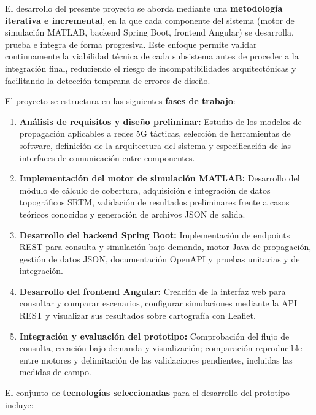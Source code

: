 El desarrollo del presente proyecto se aborda mediante una \textbf{metodología iterativa e incremental}, en la que cada componente del sistema (motor de simulación MATLAB, backend Spring Boot, frontend Angular) se desarrolla, prueba e integra de forma progresiva. Este enfoque permite validar continuamente la viabilidad técnica de cada subsistema antes de proceder a la integración final, reduciendo el riesgo de incompatibilidades arquitectónicas y facilitando la detección temprana de errores de diseño.

El proyecto se estructura en las siguientes \textbf{fases de trabajo}:

\begin{enumerate}
    \item \textbf{Análisis de requisitos y diseño preliminar:} Estudio de los modelos de propagación aplicables a redes 5G tácticas, selección de herramientas de software, definición de la arquitectura del sistema y especificación de las interfaces de comunicación entre componentes.
    
    \item \textbf{Implementación del motor de simulación MATLAB:} Desarrollo del módulo de cálculo de cobertura, adquisición e integración de datos topográficos SRTM, validación de resultados preliminares frente a casos teóricos conocidos y generación de archivos JSON de salida.
    
    \item \textbf{Desarrollo del backend Spring Boot:} Implementación de endpoints REST para consulta y simulación bajo demanda, motor Java de propagación, gestión de datos JSON, documentación OpenAPI y pruebas unitarias y de integración.
    
    \item \textbf{Desarrollo del frontend Angular:} Creación de la interfaz web para consultar y comparar escenarios, configurar simulaciones mediante la API REST y visualizar sus resultados sobre cartografía con Leaflet.
    
    \item \textbf{Integración y evaluación del prototipo:} Comprobación del flujo de consulta, creación bajo demanda y visualización; comparación reproducible entre motores y delimitación de las validaciones pendientes, incluidas las medidas de campo.
\end{enumerate}

El conjunto de \textbf{tecnologías seleccionadas} para el desarrollo del prototipo incluye:


